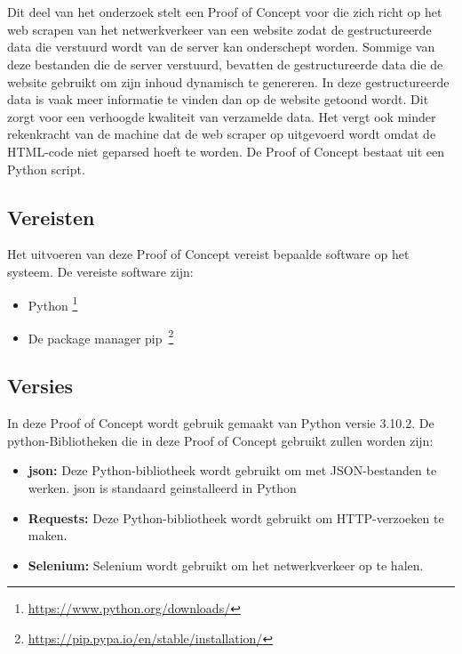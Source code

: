 \chapter{}%
\label{ch:proof-of-concept}

Dit deel van het onderzoek stelt een Proof of Concept voor die zich richt op het web scrapen van het netwerkverkeer van een website zodat de gestructureerde data die verstuurd wordt van de server kan onderschept worden. Sommige van deze bestanden die de server verstuurd, bevatten de gestructureerde data die de website gebruikt om zijn inhoud dynamisch te genereren. In deze gestructureerde data is vaak meer informatie te vinden dan op de website getoond wordt. Dit zorgt voor een verhoogde kwaliteit van verzamelde data. Het vergt ook minder rekenkracht van de machine dat de web scraper op uitgevoerd wordt omdat de HTML-code niet geparsed hoeft te worden. De Proof of Concept bestaat uit een Python script.

\section{Vereisten}
Het uitvoeren van deze Proof of Concept vereist bepaalde software op het systeem. De vereiste software zijn:
\begin{itemize}
    \item Python \footnote{\url{https://www.python.org/downloads/}}
    \item De package manager pip~\footnote{\url{https://pip.pypa.io/en/stable/installation/}}
\end{itemize}

\section{Versies}
In deze Proof of Concept wordt gebruik gemaakt van Python versie 3.10.2. De python-Bibliotheken die in deze Proof of Concept gebruikt zullen worden zijn:

\begin{itemize}
    \item \textbf{json: } Deze Python-bibliotheek wordt gebruikt om met JSON-bestanden te werken. json is standaard geinstalleerd in Python

    \item \textbf{Requests: } Deze Python-bibliotheek wordt gebruikt om HTTP-verzoeken te maken.

    \item \textbf{Selenium: } Selenium wordt gebruikt om het netwerkverkeer op te halen.
\end{itemize}

